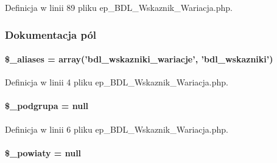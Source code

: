 Definicja w linii 89 pliku ep\-\_\-\-B\-D\-L\-\_\-\-Wskaznik\-\_\-\-Wariacja.\-php.



\subsubsection{Dokumentacja pól}
\hypertarget{classep___b_d_l___wskaznik___wariacja_ab4e31d75f0bc5d512456911e5d01366b}{
\paragraph[{\$\-\_\-aliases}]{\setlength{\rightskip}{0pt plus 5cm}\$\-\_\-aliases = array('bdl\-\_\-wskazniki\-\_\-wariacje', 'bdl\-\_\-wskazniki')}}\label{classep___b_d_l___wskaznik___wariacja_ab4e31d75f0bc5d512456911e5d01366b}


Definicja w linii 4 pliku ep\-\_\-\-B\-D\-L\-\_\-\-Wskaznik\-\_\-\-Wariacja.\-php.

\hypertarget{classep___b_d_l___wskaznik___wariacja_a0934a4cb9461f93073fd56a63cca6747}{
\paragraph[{\$\-\_\-podgrupa}]{\setlength{\rightskip}{0pt plus 5cm}\$\-\_\-podgrupa = null}}\label{classep___b_d_l___wskaznik___wariacja_a0934a4cb9461f93073fd56a63cca6747}


Definicja w linii 6 pliku ep\-\_\-\-B\-D\-L\-\_\-\-Wskaznik\-\_\-\-Wariacja.\-php.

\hypertarget{classep___b_d_l___wskaznik___wariacja_a97dc3eb2e2695666ed8ade0546691171}{
\paragraph[{\$\-\_\-powiaty}]{\setlength{\rightskip}{0pt plus 5cm}\$\-\_\-powiaty = null}}\label{classep___b_d_l___wskaznik___wariacja_a97dc3eb2e2695666ed8ade0546691171}


